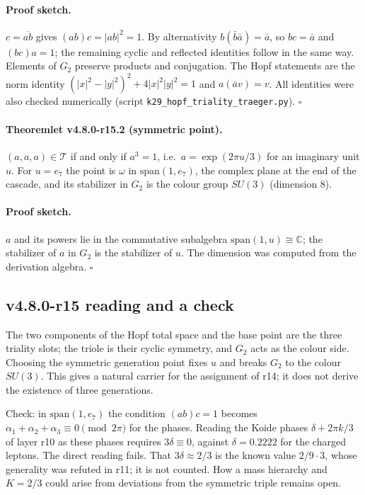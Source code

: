 \paragraph{Proof sketch.}
\(c=\overline{ab}\) gives \((ab)c=|ab|^2=1\).  By alternativity \(b(\bar b\bar a)=\bar a\), so \(bc=\bar a\) and
\((bc)a=1\); the remaining cyclic and reflected identities follow in the same way.  Elements of \(G_2\) preserve
products and conjugation.  The Hopf statements are the norm identity \((|x|^2-|y|^2)^2+4|x|^2|y|^2=1\) and
\(a(\bar a v)=v\).  All identities were also checked numerically (script \texttt{k29\_hopf\_triality\_traeger.py}).
\(\square\)

\paragraph{Theoremlet v4.8.0-r15.2 (symmetric point).}
\((a,a,a)\in\mathcal T\) if and only if \(a^3=1\), i.e.\ \(a=\exp(2\pi u/3)\) for an imaginary unit \(u\).  For
\(u=e_7\) the point is \(\omega\) in \(\mathrm{span}(1,e_7)\), the complex plane at the end of the cascade, and
its stabilizer in \(G_2\) is the colour group \(SU(3)\) (dimension \(8\)).

\paragraph{Proof sketch.}
\(a\) and its powers lie in the commutative subalgebra \(\mathrm{span}(1,u)\cong\mathbb C\); the stabilizer of
\(a\) in \(G_2\) is the stabilizer of \(u\).  The dimension was computed from the derivation algebra.  \(\square\)

\subsection*{v4.8.0-r15 reading and a check}
\label{subsec:v480-r15-reading}

The two components of the Hopf total space and the base point are the three triality slots; the triole is their
cyclic symmetry, and \(G_2\) acts as the colour side.  Choosing the symmetric generation point fixes \(u\) and breaks
\(G_2\) to the colour \(SU(3)\).  This gives a natural carrier for the assignment of r14; it does not derive the
existence of three generations.

Check: in \(\mathrm{span}(1,e_7)\) the condition \((ab)c=1\) becomes \(\alpha_1+\alpha_2+\alpha_3\equiv0\pmod{2\pi}\)
for the phases.  Reading the Koide phases \(\delta+2\pi k/3\) of layer r10 as these phases requires
\(3\delta\equiv0\), against \(\delta=0.2222\) for the charged leptons.  The direct reading fails.  That
\(3\delta\approx2/3\) is the known value \(2/9\cdot3\), whose generality was refuted in r11; it is not counted.  How
a mass hierarchy and \(K=2/3\) could arise from deviations from the symmetric triple remains open.


